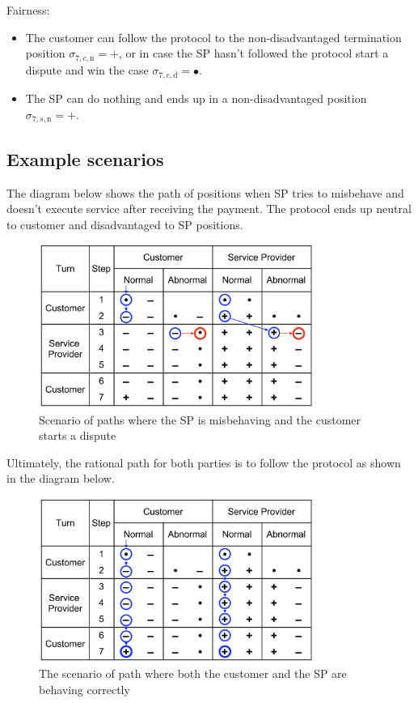 \documentclass{ieeeaccess}
\begin{document}
Fairness:

\begin{itemize}

\item
  The customer can follow the protocol to the non-disadvantaged termination position \(\sigma_{7, c, \mathrm{n}} = +\), or in case the SP hasn't followed the protocol start a dispute and win the case \(\sigma_{7, c, \overline{\mathrm{d}}} = •\).
\item
  The SP can do nothing and ends up in a non-disadvantaged position \(\sigma_{7, s, \mathrm{n}} = +\).
\end{itemize}

\subsection{Example scenarios}\label{example-scenarios}

The diagram below shows the path of positions when SP tries to misbehave and doesn't execute service after receiving the payment. The protocol ends up neutral to customer and disadvantaged to SP positions.

\begin{figure}[h!]
\includegraphics[width=9cm]{formal-misbehaviour-path.png}
\centering
\caption{Scenario of paths where the SP is misbehaving and the customer starts a dispute}
\label{fig:misbehaviour}
\end{figure}

Ultimately, the rational path for both parties is to follow the protocol as shown in the diagram below.

\begin{figure}[h!]
\includegraphics[width=9cm]{formal-rational-path.png}
\centering
\caption{The scenario of path where both the customer and  the SP are behaving correctly}
\label{fig:well-behaviour}
\end{figure}
\end{document}
